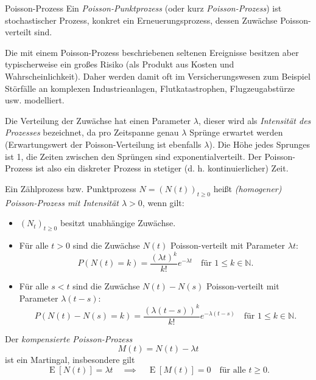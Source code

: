 \begin{defi}{Poisson-Prozess}
    Ein \emph{Poisson-Punktprozess} (oder kurz \emph{Poisson-Prozess}) ist stochastischer Prozess, konkret ein Erneuerungsprozess, dessen Zuwächse Poisson-verteilt sind.

    Die mit einem Poisson-Prozess beschriebenen seltenen Ereignisse besitzen aber typischerweise ein großes Risiko (als Produkt aus Kosten und Wahrscheinlichkeit).
    Daher werden damit oft im Versicherungswesen zum Beispiel Störfälle an komplexen Industrieanlagen, Flutkatastrophen, Flugzeugabstürze usw. modelliert.

    Die Verteilung der Zuwächse hat einen Parameter $\lambda$, dieser wird als \emph{Intensität des Prozesses} bezeichnet, da pro Zeitspanne genau $\lambda$ Sprünge erwartet werden (Erwartungswert der Poisson-Verteilung ist ebenfalls $\lambda$).
    Die Höhe jedes Sprunges ist 1, die Zeiten zwischen den Sprüngen sind exponentialverteilt.
    Der Poisson-Prozess ist also ein diskreter Prozess in stetiger (d. h. kontinuierlicher) Zeit.

    Ein Zählprozess bzw. Punktprozess $N=(N(t))_{t\geq 0}$ heißt \emph{(homogener) Poisson-Prozess mit Intensität $\lambda > 0$}, wenn gilt:
    \begin{itemize}
        \item $(N_{t})_{t\geq 0}$ besitzt unabhängige Zuwächse.
        \item Für alle $t>0$ sind die Zuwächse $N(t)$ Poisson-verteilt mit Parameter $\lambda t$:
              \[
                  P(N(t)=k) = \frac{(\lambda t)^{k}}{k!} e^{-\lambda t} \quad \text{für } 1 \leq k \in \mathbb{N}.
              \]
        \item Für alle $s<t$ sind die Zuwächse $N(t) - N(s)$ Poisson-verteilt mit Parameter $\lambda (t-s)$:
              \[
                  P(N(t) - N(s) = k) = \frac{(\lambda (t-s))^{k}}{k!} e^{-\lambda (t-s)} \quad \text{für } 1 \leq k \in \mathbb{N}.
              \]
    \end{itemize}

    Der \emph{kompensierte Poisson-Prozess}
    \[
        M(t) = N(t) - \lambda t
    \]
    ist ein Martingal, insbesondere gilt
    \[
        \operatorname{E}[N(t)] = \lambda t \quad \implies \quad \operatorname{E}[M(t)] = 0 \quad \text{für alle } t\geq 0.
    \]
\end{defi}

